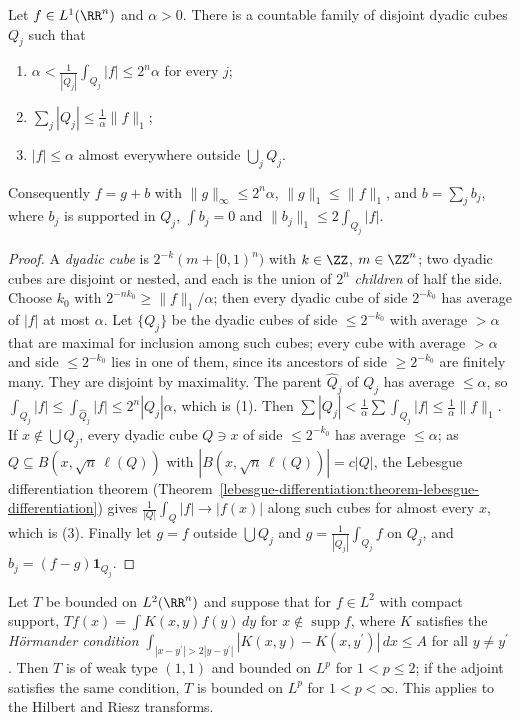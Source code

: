 \begin{theorem}\label{harmonic-analysis:theorem-calderon-zygmund-decomposition}
Let $f \in L^1(\RR^n)$ and $\alpha > 0$. There is a countable family of disjoint dyadic cubes $Q_j$ such that
\begin{enumerate}
\item $\alpha < \frac{1}{|Q_j|}\int_{Q_j}|f| \leq 2^n\alpha$ for every $j$;
\item $\sum_j|Q_j| \leq \frac1\alpha\|f\|_1$;
\item $|f| \leq \alpha$ almost everywhere outside $\bigcup_jQ_j$.
\end{enumerate}
Consequently $f = g + b$ with $\|g\|_\infty \leq 2^n\alpha$, $\|g\|_1 \leq \|f\|_1$, and $b = \sum_jb_j$, where $b_j$ is supported in $Q_j$, $\int b_j = 0$ and $\|b_j\|_1 \leq 2\int_{Q_j}|f|$.
\end{theorem}

\begin{proof}
A \emph{dyadic cube} is $2^{-k}(m + [0, 1)^n)$ with $k \in \ZZ$, $m \in \ZZ^n$; two dyadic cubes are disjoint or nested, and each is the union of $2^n$ \emph{children} of half the side. Choose $k_0$ with
$2^{-nk_0} \geq \|f\|_1/\alpha$; then every dyadic cube of side $2^{-k_0}$ has average of $|f|$ at most $\alpha$. Let $\{Q_j\}$ be the dyadic cubes of side $\leq 2^{-k_0}$ with average $> \alpha$ that are maximal for inclusion
among such cubes; every cube with average $> \alpha$ and side $\leq 2^{-k_0}$ lies in one of them, since its ancestors of side $\geq 2^{-k_0}$ are finitely many. They are disjoint by maximality. The parent $\hat Q_j$ of $Q_j$ has average
$\leq \alpha$, so $\int_{Q_j}|f| \leq \int_{\hat Q_j}|f| \leq 2^n|Q_j|\alpha$, which is (1). Then $\sum|Q_j| < \frac1\alpha\sum\int_{Q_j}|f| \leq \frac1\alpha\|f\|_1$. If $x \notin \bigcup Q_j$, every dyadic cube $Q \ni x$ of side
$\leq 2^{-k_0}$ has average $\leq \alpha$; as $Q \subseteq B(x, \sqrt n\,\ell(Q))$ with $|B(x, \sqrt n\,\ell(Q))| = c|Q|$, the Lebesgue differentiation theorem (Theorem~\ref{lebesgue-differentiation:theorem-lebesgue-differentiation})
gives $\frac{1}{|Q|}\int_Q|f| \to |f(x)|$ along such cubes for almost every $x$, which is (3). Finally let $g = f$ outside $\bigcup Q_j$ and $g = \frac{1}{|Q_j|}\int_{Q_j}f$ on $Q_j$, and $b_j = (f - g)\mathbf{1}_{Q_j}$.
\end{proof}

\begin{theorem}\label{harmonic-analysis:theorem-calderon-zygmund}
Let $T$ be bounded on $L^2(\RR^n)$ and suppose that for $f \in L^2$ with compact support, $Tf(x) = \int K(x, y)f(y)\,dy$ for $x \notin \operatorname{supp}f$, where $K$ satisfies the \emph{H\"ormander condition}
$\int_{|x - y^{\prime}| > 2|y - y^{\prime}|}|K(x, y) - K(x, y^{\prime})|\,dx \leq A$ for all $y \neq y^{\prime}$. Then $T$ is of weak type $(1, 1)$ and bounded on $L^p$ for $1 < p \leq 2$; if the adjoint satisfies the same condition, $T$ is bounded on $L^p$
for $1 < p < \infty$. This applies to the Hilbert and Riesz transforms.
\end{theorem}

